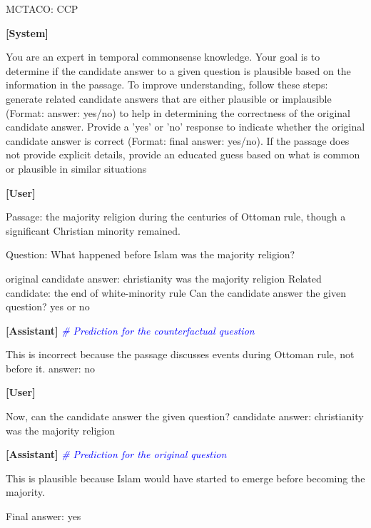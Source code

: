 \begin{myColorbox}[]{MCTACO: CCP}

\textbf{[System]}

You are an expert in temporal commonsense knowledge. Your goal is to determine if the candidate answer to a given question is plausible based on the information in the passage. To improve understanding, follow these steps: generate related candidate answers that are either plausible or implausible (Format: answer: yes/no) to help in determining the correctness of the original candidate answer. Provide a 'yes' or 'no' response to indicate whether the original candidate answer is correct (Format: final answer: yes/no). If the passage does not provide explicit details, provide an educated guess based on what is common or plausible in similar situations

\textbf{[User]}

Passage: the majority religion during the centuries of Ottoman rule, though a significant Christian minority remained. 

Question: What happened before Islam was the majority religion? 

original candidate answer: christianity was the majority religion
\newline
Related candidate: the end of white-minority rule
\newline 
Can the candidate answer the given question? yes or no

\textbf{[Assistant]}  \textit{\textcolor{blue}{\# Prediction for the counterfactual question}}

This is incorrect because the passage discusses events during Ottoman rule, not before it.
\newline
answer: no

\textbf{[User]}

Now, can the candidate answer the given question? candidate answer: christianity was the majority religion

\textbf{[Assistant]}  \textit{\textcolor{blue}{\# Prediction for the original question}}

This is plausible because Islam would have started to emerge before becoming the majority.

Final answer: yes

\end{myColorbox}